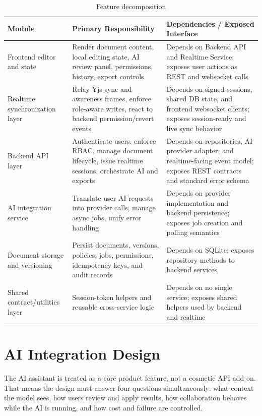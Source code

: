 \begin{table}[H]
\centering
\caption{Feature decomposition}
\label{tab:feature-decomposition}
\begin{tabularx}{\textwidth}{p{3.2cm}p{4.3cm}X}
\toprule
\textbf{Module} & \textbf{Primary Responsibility} & \textbf{Dependencies / Exposed Interface} \\
\midrule
Frontend editor and state & Render document content, local editing state, AI review panel, permissions, history, export controls & Depends on Backend API and Realtime Service; exposes user actions as REST and websocket calls \\
Realtime synchronization layer & Relay Yjs sync and awareness frames, enforce role-aware writes, react to backend permission/revert events & Depends on signed sessions, shared DB state, and frontend websocket clients; exposes session-ready and live sync behavior \\
Backend API layer & Authenticate users, enforce RBAC, manage document lifecycle, issue realtime sessions, orchestrate AI and exports & Depends on repositories, AI provider adapter, and realtime-facing event model; exposes REST contracts and standard error schema \\
AI integration service & Translate user AI requests into provider calls, manage async jobs, unify error handling & Depends on provider implementation and backend persistence; exposes job creation and polling semantics \\
Document storage and versioning & Persist documents, versions, policies, jobs, permissions, idempotency keys, and audit records & Depends on SQLite; exposes repository methods to backend services \\
Shared contract/utilities layer & Session-token helpers and reusable cross-service logic & Depends on no single service; exposes shared helpers used by backend and realtime \\
\bottomrule
\end{tabularx}
\end{table}

\section{AI Integration Design}

The AI assistant is treated as a core product feature, not a cosmetic API add-on. That means the design
must answer four questions simultaneously: what context the model sees, how users review and apply
results, how collaboration behaves while the AI is running, and how cost and failure are controlled.

